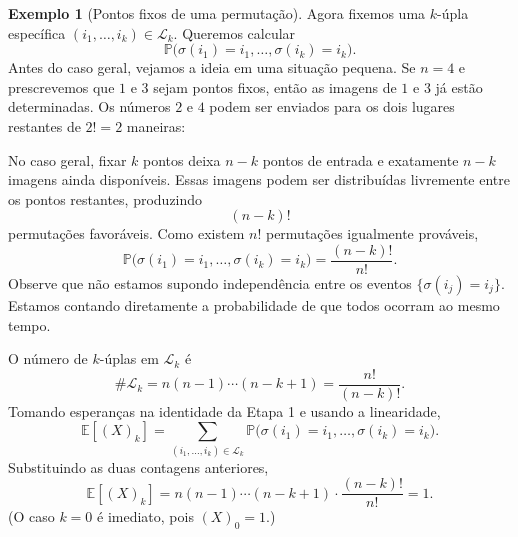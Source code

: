 \documentclass[12pt,portuguese]{article}
\theoremstyle{definition}
\newtheorem{example}[example]{Exemplo}
\theoremstyle{plainexercise}
\theoremstyle{starredexercise}
\theoremstyle{definition}
\begin{document}
\begin{example}[Pontos fixos de uma permutação]
Agora fixemos uma $k$-úpla específica $(i_1,\ldots,i_k)\in\mathcal{L}_k$.
Queremos calcular
\[
\mathbb{P}\bigl(\sigma(i_1)=i_1,\ldots,\sigma(i_k)=i_k\bigr).
\]
Antes do caso geral, vejamos a ideia em uma situação pequena. Se $n=4$ e
prescrevemos que $1$ e $3$ sejam pontos fixos, então as imagens de $1$ e $3$
já estão determinadas. Os números $2$ e $4$ podem ser enviados para os dois
lugares restantes de $2!=2$ maneiras:
\begin{center}
\end{center}
\noindent
No caso geral, fixar $k$ pontos deixa $n-k$ pontos de entrada e exatamente
$n-k$ imagens ainda disponíveis. Essas imagens podem ser distribuídas
livremente entre os pontos restantes, produzindo
\[
(n-k)!
\]
permutações favoráveis. Como existem $n!$ permutações igualmente prováveis,
\[
\mathbb{P}\bigl(\sigma(i_1)=i_1,\ldots,\sigma(i_k)=i_k\bigr)
=\frac{(n-k)!}{n!}.
\]
Observe que não estamos supondo independência entre os eventos
$\{\sigma(i_j)=i_j\}$. Estamos contando diretamente a probabilidade de que
todos ocorram ao mesmo tempo.

O número de $k$-úplas em $\mathcal{L}_k$ é
\[
\#\mathcal{L}_k=n(n-1)\cdots(n-k+1)
=\frac{n!}{(n-k)!}.
\]
Tomando esperanças na identidade da Etapa 1 e usando a linearidade,
\[
\mathbb{E}[(X)_k]
=\sum_{(i_1,\ldots,i_k)\in\mathcal{L}_k}
\mathbb{P}\bigl(\sigma(i_1)=i_1,\ldots,\sigma(i_k)=i_k\bigr).
\]
Substituindo as duas contagens anteriores,
\begin{equation}\label{eq:momento-fatorial-pontos-fixos}
\mathbb{E}[(X)_k]
=n(n-1)\cdots(n-k+1)\cdot\frac{(n-k)!}{n!}
=1.
\end{equation}
(O caso $k=0$ é imediato, pois $(X)_0=1$.)


\end{example}
\end{document}
